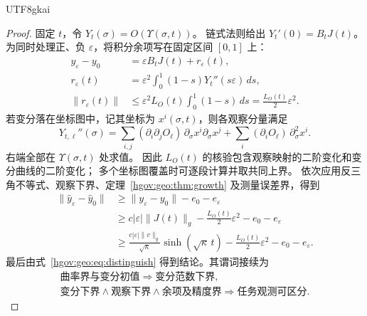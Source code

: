 \documentclass[12pt,a4paper,openany,notitlepage]{report}
\theoremstyle{plain}
\theoremstyle{definition}
\theoremstyle{remark}
\def\mathcal#1{#1}\def\mathsf#1{#1}\def\mathbb#1{#1}%
\begin{document}
\begin{CJK*}{UTF8}{gkai}
\begin{proof}
固定 $t$，令 $Y_t(\sigma)=\mathcal O(\Upsilon(\sigma,t))$。
链式法则给出 $Y_t'(0)=B_tJ(t)$。
为同时处理正、负 $\varepsilon$，将积分余项写在固定区间 $[0,1]$ 上：
\[
\begin{aligned}
y_\varepsilon-y_0
&=\varepsilon B_tJ(t)+r_\varepsilon(t),\\
r_\varepsilon(t)
&=\varepsilon^2\int_0^1(1-s)Y_t''(s\varepsilon)\,ds,\\
\lVert r_\varepsilon(t)\rVert
&\le\varepsilon^2L_{\mathcal O}(t)\int_0^1(1-s)\,ds
=\frac{L_{\mathcal O}(t)}2\varepsilon^2.
\end{aligned}
\]
若变分落在坐标图中，记其坐标为 $x^i(\sigma,t)$，则各观察分量满足
\[
Y_{t,\ell}''(\sigma)
=\sum_{i,j}(\partial_i\partial_j\mathcal O_\ell)
\,\partial_\sigma x^i\partial_\sigma x^j
+\sum_i(\partial_i\mathcal O_\ell)\,\partial_\sigma^2x^i.
\]
右端全部在 $\Upsilon(\sigma,t)$ 处求值。
因此 $L_{\mathcal O}(t)$ 的核验包含观察映射的二阶变化和变分曲线的二阶变化；
多个坐标图覆盖时可逐段计算并取共同上界。
依次应用反三角不等式、观察下界、定理~\ref{hgov:geo:thm:growth} 及测量误差界，得到
\[
\begin{aligned}
\lVert\widehat y_\varepsilon-\widehat y_0\rVert
&\ge\lVert y_\varepsilon-y_0\rVert-e_0-e_\varepsilon\\
&\ge c|\varepsilon|\lVert J(t)\rVert_g
-\frac{L_{\mathcal O}(t)}2\varepsilon^2-e_0-e_\varepsilon\\
&\ge\frac{c|\varepsilon|\lVert v\rVert_g}{\sqrt\kappa}
\sinh(\sqrt\kappa\,t)
-\frac{L_{\mathcal O}(t)}2\varepsilon^2-e_0-e_\varepsilon.
\end{aligned}
\]
最后由式~\eqref{hgov:geo:eq:distinguish} 得到结论。其谓词接续为
\[
\begin{gathered}
\text{曲率界与变分初值}
\Longrightarrow\text{变分范数下界},\\
\text{变分下界}\land\text{观察下界}\land\text{余项及精度界}
\Longrightarrow\text{任务观测可区分}.
\end{gathered}
\]
\end{proof}


\end{CJK*}
\end{document}
